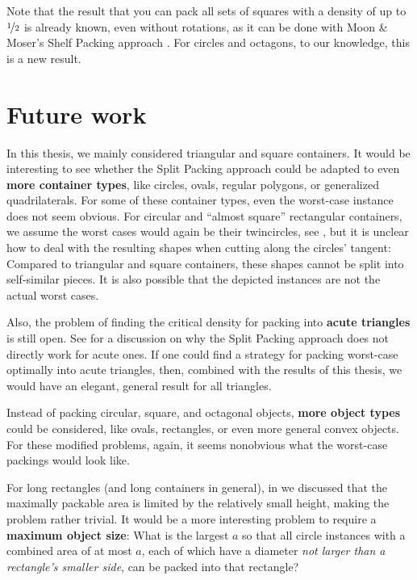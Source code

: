 \documentclass[a4paper,style=print,bibliography=totoc,nexus,lnum,extramargin]{tubsbook}
\begin{document}
Note that the result that you can pack all sets of squares with a density of up to $\nicefrac 1 2$ is already known, even without rotations, as it can be done with Moon \& Moser's Shelf Packing approach \cite{MM1967some}. For circles and octagons, to our knowledge, this is a new result.

\chapter{Future work}\label{ch:future-work}

In this thesis, we mainly considered triangular and square containers. It would be interesting to see whether the Split Packing approach could be adapted to even \textbf{more container types}, like circles, ovals, regular polygons, or generalized quadrilaterals. For some of these container types, even the worst-case instance does not seem obvious. For circular and “almost square” rectangular containers, we assume the worst cases would again be their twincircles, see , but it is unclear how to deal with the resulting shapes when cutting along the circles' tangent: Compared to triangular and square containers, these shapes cannot be split into self-similar pieces. It is also possible that the depicted instances are not the actual worst cases.


Also, the problem of finding the critical density for packing into \textbf{acute triangles} is still open. See  for a discussion on why the Split Packing approach does not directly work for acute ones. If one could find a strategy for packing worst-case optimally into acute triangles, then, combined with the results of this thesis, we would have an elegant, general result for all triangles.

Instead of packing circular, square, and octagonal objects, \textbf{more object types} could be considered, like ovals, rectangles, or even more general convex objects. For these modified problems, again, it seems nonobvious what the worst-case packings would look like.

For long rectangles (and long containers in general), in  we discussed that the maximally packable area is limited by the relatively small height, making the problem rather trivial. It would be a more interesting problem to require a \textbf{maximum object size}: What is the largest $a$ so that all circle instances with a combined area of at most $a$, each of which have a diameter \emph{not larger than a rectangle's smaller side}, can be packed into that rectangle?
\end{document}
